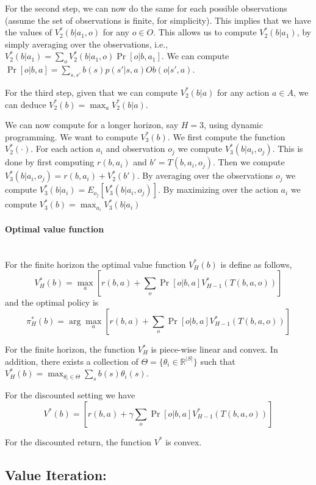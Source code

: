 For the second step, we can now do the same for each possible observations (assume the set of observations is finite, for simplicity). This implies that we have the values of $V^*_2(b|a_1,o)$ for any $o\in O$. This allows us to compute $V^*_2(b|a_1)$, by simply averaging over the observations, i.e., $V^*_2(b|a_1)=\sum_o V^*_2(b|a_1,o)\Pr[o|b,a_1]$. We can compute $\Pr[o|b,a]=\sum_{s,s'} b(s)p(s'|s,a)Ob(o|s',a)$.

For the third step, given that we can compute $V_2^*(b|a)$ for any action $a\in A$, we
can deduce $V_2^*(b)=\max_a V_2^*(b|a)$.

We can now compute for a longer horizon, say $H=3$, using dynamic programming. We want to compute $V^*_3(b)$. We first compute the function $V_2^*(\cdot)$. For each action $a_i$ and observation $o_j$ we compute $V^*_3(b|a_i,o_j)$. This is done by first computing $r(b,a_i)$ and $b'=T(b,a_i,o_j)$. Then we compute $V^*_3(b|a_i,o_j)
= r(b,a_i)+V^*_2(b')$. By averaging over the observations $o_j$ we compute $V_3^*(b|a_i)=E_{o_j}[V^*_3(b|a_i,o_j)]$. By maximizing over the action $a_i$ we compute $V_3^*(b)=\max_{a_i} V^*_3(b|a_i)$

\paragraph{Optimal value function}\ \\
For the finite horizon the optimal value function $V^*_H(b)$ is
define as follows,
\[
V^*_H(b)=\max_a [r(b,a)+\sum_o \Pr[o|b,a]V^*_{H-1}(T(b,a,o))]
\]
and the optimal policy is
\[
\pi_H^*(b)=\arg\max_a [r(b,a)+\sum_o \Pr[o|b,a]V^*_{H-1}(T(b,a,o))]
\]

\begin{theorem}
\label{pomdp:thm:FH}
For the finite horizon, the function $V^*_H$ is piece-wise linear
and convex. In addition, there exists a collection of
$\Theta=\{\theta_i\in \mathbb{R}^{|S|}\}$ such that
$V^*_H(b)=\max_{\theta_i\in\Theta} \sum_s b(s)\theta_i(s)$.
\end{theorem}

For the discounted setting we have
\[
V^*(b)=[r(b,a)+\gamma\sum_o \Pr[o|b,a]V^*_{H-1}(T(b,a,o))]
\]
\begin{theorem}
For the discounted return, the function $V^*$ is convex.
\end{theorem}



\subsection{Value Iteration:}

